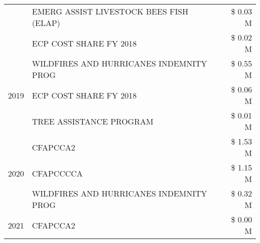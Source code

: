 \begin{tabular}{llr}
 & EMERG ASSIST LIVESTOCK BEES FISH (ELAP) & \$ 0.03 M \\
 & ECP COST SHARE FY 2018 & \$ 0.02 M \\
\cline{1-3}
\multirow[t]{3}{*}{2019} & WILDFIRES AND HURRICANES INDEMNITY PROG & \$ 0.55 M \\
 & ECP COST SHARE FY 2018 & \$ 0.06 M \\
 & TREE ASSISTANCE PROGRAM & \$ 0.01 M \\
\cline{1-3}
\multirow[t]{3}{*}{2020} & CFAPCCA2 & \$ 1.53 M \\
 & CFAPCCCCA & \$ 1.15 M \\
 & WILDFIRES AND HURRICANES INDEMNITY PROG & \$ 0.32 M \\
\cline{1-3}
2021 & CFAPCCA2 & \$ 0.00 M \\
\cline{1-3}
\bottomrule
\end{tabular}
